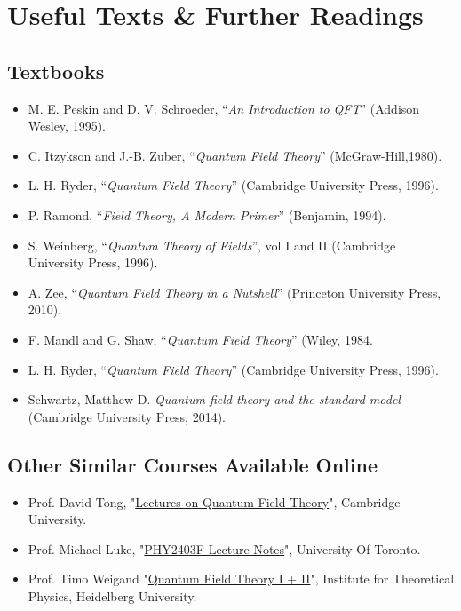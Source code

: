 \chapter*{Useful Texts \& Further Readings}

\section*{Textbooks}
\begin{itemize}
    \item M. E. Peskin and D. V. Schroeder, “\textit{An Introduction to QFT}” (Addison Wesley, 1995).
    \item C. Itzykson and J.-B. Zuber, “\textit{Quantum Field Theory}” (McGraw-Hill,1980).
    \item L. H. Ryder, “\textit{Quantum Field Theory}” (Cambridge University Press, 1996). 
    \item P. Ramond, “\textit{Field Theory, A Modern Primer}” (Benjamin, 1994).
    \item S. Weinberg, “\textit{Quantum Theory of Fields}”, vol I and II (Cambridge University Press, 1996).
    \item A. Zee, “\textit{Quantum Field Theory in a Nutshell}” (Princeton University Press, 2010).
    \item F. Mandl and G. Shaw, “\textit{Quantum Field Theory}” (Wiley, 1984.
    \item L. H. Ryder, “\textit{Quantum Field Theory}” (Cambridge University Press, 1996).
    \item Schwartz, Matthew D. \textit{Quantum field theory and the standard model} (Cambridge University Press, 2014).
\end{itemize}

\section*{Other Similar Courses Available Online}
\begin{itemize}
    \item Prof. David Tong,  "\href{http://www.damtp.cam.ac.uk/user/tong/qft.html}{Lectures on Quantum Field Theory}", Cambridge University. 
    \item Prof. Michael Luke, "\href{https://www.physics.utoronto.ca/~luke/PHY2403F/References_files/lecturenotes.pdf}{PHY2403F Lecture Notes}", University Of Toronto. 
    \item Prof. Timo Weigand "\href{https://www.thphys.uni-heidelberg.de/~weigand/QFT2-14/SkriptQFT2.pdf}{Quantum Field Theory I + II}", Institute for Theoretical Physics, Heidelberg University. 
\end{itemize}